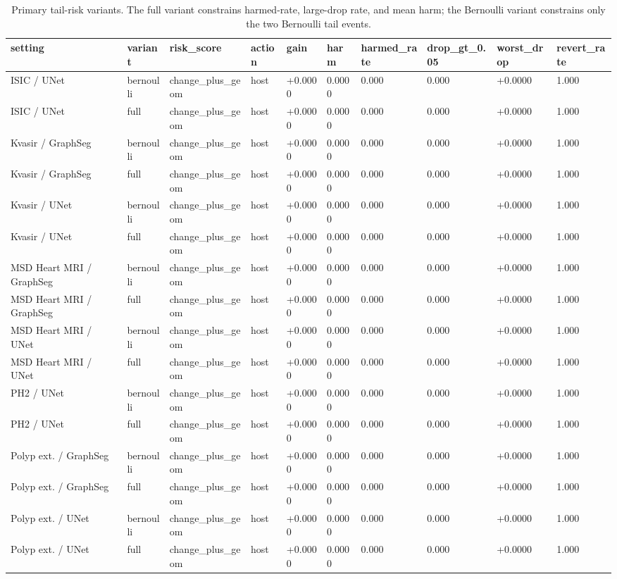 \begin{table}[t]
\centering
\small
\caption{Primary tail-risk variants. The full variant constrains harmed-rate, large-drop rate, and mean harm; the Bernoulli variant constrains only the two Bernoulli tail events.}
\label{tab:tail_risk_primary_variants}
\begin{tabular}{llllllllll}
\toprule
setting & variant & risk\_score & action & gain & harm & harmed\_rate & drop\_gt\_0.05 & worst\_drop & revert\_rate \\
\midrule
ISIC / UNet & bernoulli & change\_plus\_geom & host & +0.0000 & 0.0000 & 0.000 & 0.000 & +0.0000 & 1.000 \\
ISIC / UNet & full & change\_plus\_geom & host & +0.0000 & 0.0000 & 0.000 & 0.000 & +0.0000 & 1.000 \\
Kvasir / GraphSeg & bernoulli & change\_plus\_geom & host & +0.0000 & 0.0000 & 0.000 & 0.000 & +0.0000 & 1.000 \\
Kvasir / GraphSeg & full & change\_plus\_geom & host & +0.0000 & 0.0000 & 0.000 & 0.000 & +0.0000 & 1.000 \\
Kvasir / UNet & bernoulli & change\_plus\_geom & host & +0.0000 & 0.0000 & 0.000 & 0.000 & +0.0000 & 1.000 \\
Kvasir / UNet & full & change\_plus\_geom & host & +0.0000 & 0.0000 & 0.000 & 0.000 & +0.0000 & 1.000 \\
MSD Heart MRI / GraphSeg & bernoulli & change\_plus\_geom & host & +0.0000 & 0.0000 & 0.000 & 0.000 & +0.0000 & 1.000 \\
MSD Heart MRI / GraphSeg & full & change\_plus\_geom & host & +0.0000 & 0.0000 & 0.000 & 0.000 & +0.0000 & 1.000 \\
MSD Heart MRI / UNet & bernoulli & change\_plus\_geom & host & +0.0000 & 0.0000 & 0.000 & 0.000 & +0.0000 & 1.000 \\
MSD Heart MRI / UNet & full & change\_plus\_geom & host & +0.0000 & 0.0000 & 0.000 & 0.000 & +0.0000 & 1.000 \\
PH2 / UNet & bernoulli & change\_plus\_geom & host & +0.0000 & 0.0000 & 0.000 & 0.000 & +0.0000 & 1.000 \\
PH2 / UNet & full & change\_plus\_geom & host & +0.0000 & 0.0000 & 0.000 & 0.000 & +0.0000 & 1.000 \\
Polyp ext. / GraphSeg & bernoulli & change\_plus\_geom & host & +0.0000 & 0.0000 & 0.000 & 0.000 & +0.0000 & 1.000 \\
Polyp ext. / GraphSeg & full & change\_plus\_geom & host & +0.0000 & 0.0000 & 0.000 & 0.000 & +0.0000 & 1.000 \\
Polyp ext. / UNet & bernoulli & change\_plus\_geom & host & +0.0000 & 0.0000 & 0.000 & 0.000 & +0.0000 & 1.000 \\
Polyp ext. / UNet & full & change\_plus\_geom & host & +0.0000 & 0.0000 & 0.000 & 0.000 & +0.0000 & 1.000 \\
\bottomrule
\end{tabular}
\end{table}
